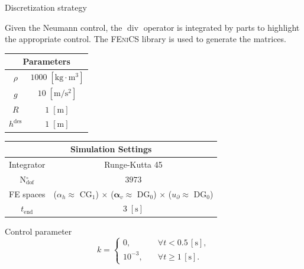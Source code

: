 \documentclass[aspectratio=169]{ISAE-Beamer}
\renewcommand{\div}{\operatorname{div}}
\newcommand{\fenics}{\textsc{FEniCS}\xspace}
\begin{document}
\begin{frame}{Discretization strategy}

Given the Neumann control, the $\div$ operator is integrated by parts to highlight the appropriate control. The \fenics library is used to generate the matrices.
\begin{table}[th]
	\centering
	\begin{tabular}{|c|c|}
		\hline 
		\multicolumn{2}{|c|}{Parameters} \\ 
		\hline 
		$\rho$ & $1000\; \mathrm{[kg \cdot m^3]}$ \\ 
		$g$& $10\; \mathrm{[m/s^2]}$ \\ 
		$R$& $1\; \mathrm{[m]}$\\ 
		$h^{\text{des}}$& $1\; \mathrm{[m]}$ \\ 
		\hline 
	\end{tabular} \hspace{.3cm}
	\begin{tabular}{|c|c|}
		\hline 
		\multicolumn{2}{|c|}{Simulation Settings} \\
		\hline 
		Integrator & Runge-Kutta 45 \\
		N$_{\text{dof}}^\circ$ & $3973$ \\
		FE spaces & ($\alpha_h\approx$ CG$_1$) $\times$ ($\bm{\alpha}_v\approx$ DG$_0$) $\times$ ($u_\partial\approx$ DG$_0$)\\
		$t_{\text{end}}$ & $3\; \mathrm{[s]}$\\ 
		\hline 
	\end{tabular} 
\end{table}
\vspace{.5cm}
Control parameter
\begin{equation*}
k = 
\begin{cases}
0, \quad &\forall t < 0.5 \, [\mathrm{s}], \\
10^{-3}, \quad &\forall t \ge 1 \, [\mathrm{s}].
\end{cases}
\end{equation*}
		
\end{frame}
\end{document}
